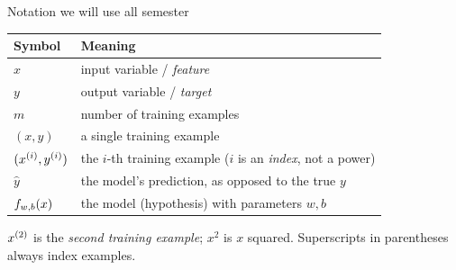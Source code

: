 \documentclass[aspectratio=169,10pt]{beamer}
\begin{document}
\begin{frame}{Notation we will use all semester}
  \small
  \begin{center}
  \renewcommand{\arraystretch}{1.3}
  \begin{tabular}{@{}ll@{}}
    \toprule
    \textbf{Symbol} & \textbf{Meaning}\\
    \midrule
    $x$ & input variable / \emph{feature}\\
    $y$ & output variable / \emph{target}\\
    $m$ & number of training examples\\
    $(x,y)$ & a single training example\\
    $(x^{(i)},y^{(i)})$ & the $i$-th training example ($i$ is an \emph{index}, not a power)\\
    $\hat{y}$ & the model's prediction, as opposed to the true $y$\\
    $f_{w,b}(x)$ & the model (hypothesis) with parameters $w,b$\\
    \bottomrule
  \end{tabular}
  \end{center}
  \vspace{2mm}
  \begin{pitfall}
    $x^{(2)}$ is the \emph{second training example}; $x^2$ is $x$ squared.
    Superscripts in parentheses always index examples.
  \end{pitfall}
\end{frame}
\end{document}
